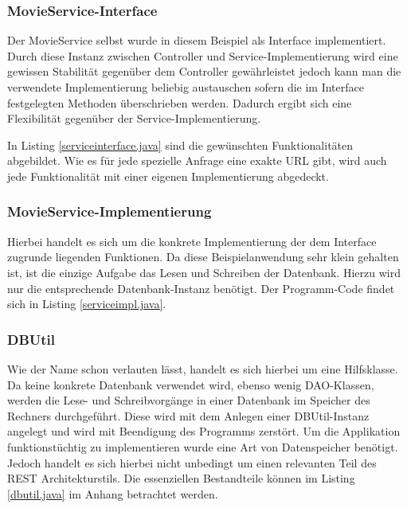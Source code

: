 \documentclass[fleqn,10.5pt,ngerman]{SelfArx}
\begin{document}
\subsubsection{MovieService-Interface}
Der MovieService selbst wurde in diesem Beispiel als Interface implementiert. Durch diese Instanz zwischen Controller und Service-Implementierung wird eine gewissen Stabilität gegenüber dem Controller gewährleistet jedoch kann man die verwendete Implementierung beliebig austauschen sofern die im Interface festgelegten Methoden überschrieben werden. Dadurch ergibt sich eine Flexibilität gegenüber der Service-Implementierung. 

In Listing \ref{serviceinterface.java} sind die gewünschten Funktionalitäten abgebildet. Wie es für jede spezielle Anfrage eine exakte URL gibt, wird auch jede Funktionalität mit einer eigenen Implementierung abgedeckt.
\subsubsection{MovieService-Implementierung}
Hierbei handelt es sich um die konkrete Implementierung der dem Interface zugrunde liegenden Funktionen. Da diese Beispielanwendung sehr klein gehalten ist, ist die einzige Aufgabe das Lesen und Schreiben der Datenbank. Hierzu wird nur die entsprechende Datenbank-Instanz benötigt. Der Programm-Code findet sich in Listing \ref{serviceimpl.java}.

\subsubsection{DBUtil}
Wie der Name schon verlauten lässt, handelt es sich hierbei um eine Hilfsklasse. Da keine konkrete Datenbank verwendet wird, ebenso wenig DAO-Klassen, werden die Lese- und Schreibvorgänge in einer Datenbank im Speicher des Rechners durchgeführt. Diese wird mit dem Anlegen einer DBUtil-Instanz angelegt und wird mit Beendigung des Programms zerstört. Um die Applikation funktionstüchtig zu implementieren wurde eine Art von Datenspeicher benötigt. Jedoch handelt es sich hierbei nicht unbedingt um einen relevanten Teil des REST Architekturstils. Die essenziellen Bestandteile können im Listing \ref{dbutil.java} im Anhang betrachtet werden.
\end{document}
